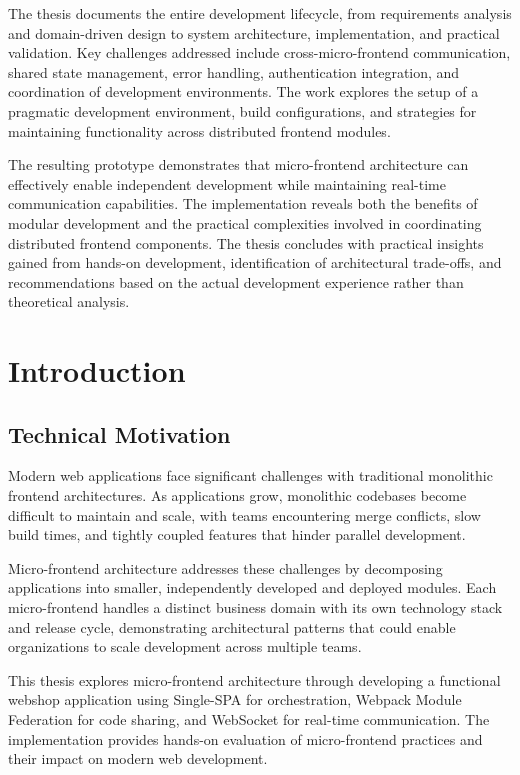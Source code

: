 \documentclass[12pt,a4paper]{report}
\begin{document}
The thesis documents the entire development lifecycle, from requirements analysis and domain-driven design to system architecture, implementation, and practical validation. Key challenges addressed include cross-micro-frontend communication, shared state management, error handling, authentication integration, and coordination of development environments. The work explores the setup of a pragmatic development environment, build configurations, and strategies for maintaining functionality across distributed frontend modules.

The resulting prototype demonstrates that micro-frontend architecture can effectively enable independent development while maintaining real-time communication capabilities. The implementation reveals both the benefits of modular development and the practical complexities involved in coordinating distributed frontend components. The thesis concludes with practical insights gained from hands-on development, identification of architectural trade-offs, and recommendations based on the actual development experience rather than theoretical analysis.

\tableofcontents
\listoffigures
\listoftables

\chapter{Introduction}
\section{Technical Motivation}
Modern web applications face significant challenges with traditional monolithic frontend architectures. As applications grow, monolithic codebases become difficult to maintain and scale, with teams encountering merge conflicts, slow build times, and tightly coupled features that hinder parallel development.

Micro-frontend architecture addresses these challenges by decomposing applications into smaller, independently developed and deployed modules. Each micro-frontend handles a distinct business domain with its own technology stack and release cycle, demonstrating architectural patterns that could enable organizations to scale development across multiple teams.

This thesis explores micro-frontend architecture through developing a functional webshop application using Single-SPA for orchestration, Webpack Module Federation for code sharing, and WebSocket for real-time communication. The implementation provides hands-on evaluation of micro-frontend practices and their impact on modern web development.
\end{document}
